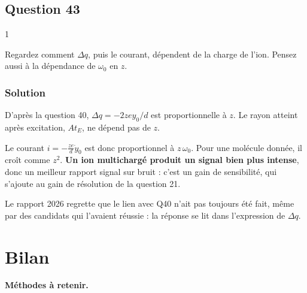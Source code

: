 \documentclass[11pt,a4paper]{article}
\begin{document}
\hypertarget{question-43}{%
\subsection{Question 43}\label{question-43}}

\begin{indication}{1}

Regardez comment \(\Delta q\), puis le courant, dépendent de la charge de l'ion. Pensez aussi à la dépendance de \(\omega_0\) en \(z\).

\end{indication}

\hypertarget{solution-42}{%
\subsubsection{Solution}\label{solution-42}}

D'après la question 40, \(\Delta q=-2zey_0/d\) est proportionnelle à \(z\). Le rayon atteint après excitation, \(At_E\), ne dépend pas de \(z\).

Le courant \(i=-\frac{ze}d\dot y_0\) est donc proportionnel à \(z\,\omega_0\). Pour une molécule donnée, il croît comme \(z^2\). \textbf{Un ion multichargé produit un signal bien plus intense}, donc un meilleur rapport signal sur bruit : c'est un gain de sensibilité, qui s'ajoute au gain de résolution de la question 21.

\begin{jury}

Le rapport 2026 regrette que le lien avec Q40 n'ait pas toujours été fait, même par des candidats qui l'avaient réussie : la réponse se lit dans l'expression de \(\Delta q\).

\end{jury}

\hypertarget{bilan}{%
\section{Bilan}\label{bilan}}

\textbf{Méthodes à retenir.}
\end{document}
